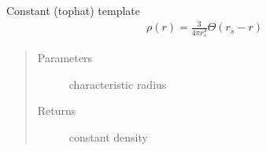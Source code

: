 \documentclass[letterpaper,10pt,english]{sphinxmanual}
\begin{document}
\begin{fulllineitems}
\label{\detokenize{diffsph.profiles:diffsph.profiles.templates.const}}
\sphinxAtStartPar
Constant (top\sphinxhyphen{}hat) template
\begin{equation*}
\begin{split}\rho(r) = \frac3{4\pi r_s^3}\Theta(r_s-r)\end{split}
\end{equation*}\begin{quote}\begin{description}
\item[{Parameters}] \leavevmode
\sphinxAtStartPar
{} \textendash{} characteristic radius

\item[{Returns}] \leavevmode
\sphinxAtStartPar
constant density

\end{description}\end{quote}

\end{fulllineitems}

\end{document}
